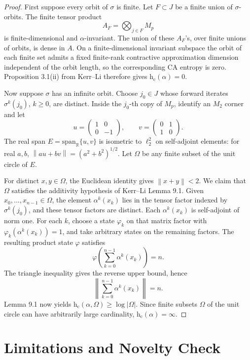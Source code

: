 \documentclass[11pt]{article}
\newcommand{\hc}{\mathrm{h}_{\mathrm c}}
\newcommand{\norm}[1]{\left\lVert #1 \right\rVert}
\begin{document}
\begin{proof}
First suppose every orbit of \(\sigma\) is finite. Let \(F\subset J\) be a
finite union of \(\sigma\)-orbits. The finite tensor product
\[
  A_F=\bigotimes_{j\in F} M_p
\]
is finite-dimensional and \(\alpha\)-invariant. The union of these \(A_F\)'s,
over finite unions of orbits, is dense in \(A\). On a finite-dimensional
invariant subspace the orbit of each finite set admits a fixed finite-rank
contractive approximation dimension independent of the orbit length, so the
corresponding CA entropy is zero. Proposition 3.1(ii) from Kerr--Li therefore
gives \(\hc(\alpha)=0\).

Now suppose \(\sigma\) has an infinite orbit. Choose \(j_0\in J\) whose
forward iterates \(\sigma^k(j_0)\), \(k\geq0\), are distinct. Inside the
\(j_0\)-th copy of \(M_p\), identify an \(M_2\) corner and let
\[
  u=\begin{pmatrix}1&0\\0&-1\end{pmatrix},
  \qquad
  v=\begin{pmatrix}0&1\\1&0\end{pmatrix}.
\]
The real span \(E=\mathrm{span}_{\mathbb R}\{u,v\}\) is isometric to
\(\ell_2^2\) on self-adjoint elements: for real \(a,b\),
\(\norm{au+bv}=(a^2+b^2)^{1/2}\). Let \(\Omega\) be any finite subset of the
unit circle of \(E\).

For distinct \(x,y\in\Omega\), the Euclidean identity gives
\(\norm{x+y}<2\). We claim that \(\Omega\) satisfies the additivity hypothesis
of Kerr--Li Lemma 9.1. Given \(x_0,\ldots,x_{n-1}\in\Omega\), the element
\(\alpha^k(x_k)\) lies in the tensor factor indexed by \(\sigma^k(j_0)\), and
these tensor factors are distinct. Each \(\alpha^k(x_k)\) is self-adjoint of
norm one. For each \(k\), choose a state \(\varphi_k\) on that matrix factor
with \(\varphi_k(\alpha^k(x_k))=1\), and take arbitrary states on the remaining
factors. The resulting product state \(\varphi\) satisfies
\[
  \varphi\left(\sum_{k=0}^{n-1}\alpha^k(x_k)\right)=n.
\]
The triangle inequality gives the reverse upper bound, hence
\[
  \left\|\sum_{k=0}^{n-1}\alpha^k(x_k)\right\|=n.
\]
Lemma 9.1 now yields \(\hc(\alpha,\Omega)\geq \log|\Omega|\). Since finite
subsets \(\Omega\) of the unit circle can have arbitrarily large cardinality,
\(\hc(\alpha)=\infty\).
\end{proof}

\section*{Limitations and Novelty Check}
\end{document}
